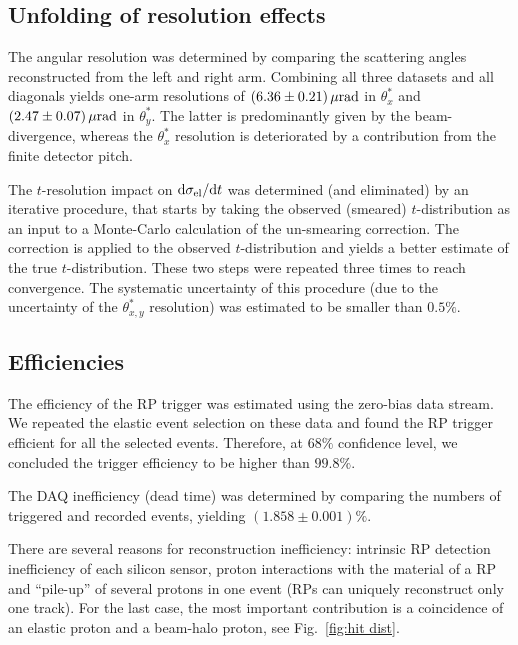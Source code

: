 \documentclass[doublecol]{../macros/epl2}
\def\d{{\rm d}}
\def\un#1{\,{\rm #1}}
\begin{document}
\subsection{Unfolding of resolution effects}

The angular resolution was determined by comparing the scattering angles reconstructed from the left and right arm. Combining all three datasets and all diagonals yields one-arm resolutions of $(6.36\pm 0.21)\un{\mu rad}$ in $\theta^*_x$ and $(2.47\pm 0.07)\un{\mu rad}$ in $\theta^*_y$. The latter is predominantly given by the beam-divergence, whereas the $\theta^*_x$ resolution is deteriorated by a contribution from the finite detector pitch.

The $t$-resolution impact on $\d\sigma_{\rm el}/\d t$  was determined (and eliminated) by an iterative procedure, that starts by taking the observed (smeared) $t$-distribution as an input to a Monte-Carlo calculation of the un-smearing correction. The correction is applied to the observed $t$-distribution and yields a better estimate of the true $t$-distribution. These two steps were repeated three times to reach convergence. The systematic uncertainty of this procedure (due to the uncertainty of the $\theta^*_{x, y}$ resolution) was estimated to be smaller than $0.5\%$.

\subsection{Efficiencies}

The efficiency of the RP trigger was estimated using the zero-bias data stream. We repeated the elastic event selection on these data and found the RP trigger efficient for all the selected events. Therefore, at $68\%$ confidence level, we concluded the trigger efficiency to be higher than $99.8\%$.

The DAQ inefficiency (dead time) was determined by comparing the numbers of triggered and recorded events, yielding $(1.858 \pm 0.001)\%$.

There are several reasons for reconstruction inefficiency: intrinsic RP detection inefficiency of each silicon sensor, proton interactions with the material of a RP and ``pile-up'' of several protons in one event (RPs can uniquely reconstruct only one track). For the last case, the most important contribution is a coincidence of an elastic proton and a beam-halo proton, see Fig.~\ref{fig:hit dist}.
\end{document}
